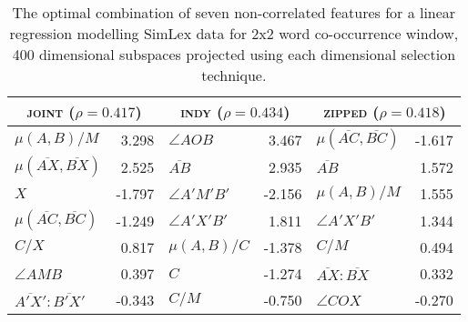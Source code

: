
\begin{table}
\centering
\begin{tabular}{lr|lr|lr}
\hline
\multicolumn{2}{c}{\textsc{joint} ($\rho = 0.417$)} & \multicolumn{2}{c}{\textsc{indy} ($\rho = 0.434$)} & \multicolumn{2}{c}{\textsc{zipped} ($\rho = 0.418$)} \\
\hline
$\mu(A,B)/M$ & 3.298 & $\angle AOB$ & 3.467 & $\mu(\overline{AC},\overline{BC})$ & -1.617 \\
$\mu(\overline{AX},\overline{BX})$ & 2.525 & $\overline{AB}$ & 2.935 & $\overline{AB}$ & 1.572 \\
$X$ & -1.797 & $\angle A'M'B'$ & -2.156 & $\mu(A,B)/M$ & 1.555 \\
$\mu(\overline{AC},\overline{BC})$ & -1.249 & $\angle A'X'B'$ & 1.811 & $\angle A'X'B'$ & 1.344 \\
$C/X$ & 0.817 & $\mu(A,B)/C$ & -1.378 & $C/M$ & 0.494 \\
$\angle AMB$ & 0.397 & $C$ & -1.274 & $\overline{AX}:\overline{BX}$ & 0.332 \\
$\overline{A'X'}:\overline{B'X'}$ & -0.343 & $C/M$ & -0.750 & $\angle COX$ & -0.270 \\
\hline
\end{tabular}
\caption{The optimal combination of seven non-correlated features for a linear regression modelling SimLex data for 2x2 word co-occurrence window, 400 dimensional subspaces projected using each dimensional selection technique.}
\label{tab:fivelated}
\end{table}


